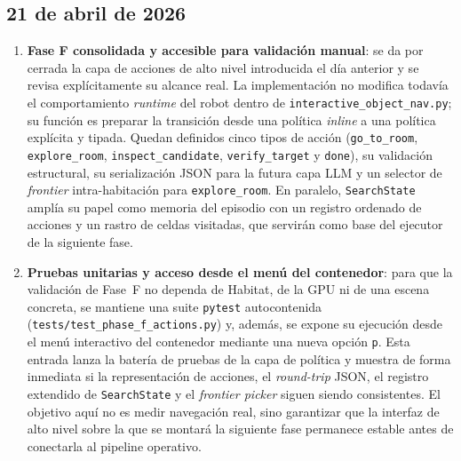\subsection*{21 de abril de 2026}

\begin{enumerate}

  \item \textbf{Fase F consolidada y accesible para validación manual}: se da
        por cerrada la capa de acciones de alto nivel introducida el día
        anterior y se revisa explícitamente su alcance real. La implementación
        no modifica todavía el comportamiento \emph{runtime} del robot dentro
        de \texttt{interactive\_object\_nav.py}; su función es preparar la
        transición desde una política \emph{inline} a una política explícita y
        tipada. Quedan definidos cinco tipos de acción
        (\texttt{go\_to\_room}, \texttt{explore\_room},
        \texttt{inspect\_candidate}, \texttt{verify\_target} y
        \texttt{done}), su validación estructural, su serialización JSON para
        la futura capa LLM y un selector de \emph{frontier} intra-habitación
        para \texttt{explore\_room}. En paralelo, \texttt{SearchState} amplía
        su papel como memoria del episodio con un registro ordenado de acciones
        y un rastro de celdas visitadas, que servirán como base del ejecutor de
        la siguiente fase.

  \item \textbf{Pruebas unitarias y acceso desde el menú del contenedor}: para
        que la validación de Fase~F no dependa de Habitat, de la GPU ni de una
        escena concreta, se mantiene una suite \texttt{pytest} autocontenida
        (\texttt{tests/test\_phase\_f\_actions.py}) y, además, se expone su
        ejecución desde el menú interactivo del contenedor mediante una nueva
        opción \texttt{p}. Esta entrada lanza la batería de pruebas de la capa
        de política y muestra de forma inmediata si la representación de
        acciones, el \textit{round-trip} JSON, el registro extendido de
        \texttt{SearchState} y el \textit{frontier picker} siguen siendo
        consistentes. El objetivo aquí no es medir navegación real, sino
        garantizar que la interfaz de alto nivel sobre la que se montará la
        siguiente fase permanece estable antes de conectarla al pipeline
        operativo.


\end{enumerate}

